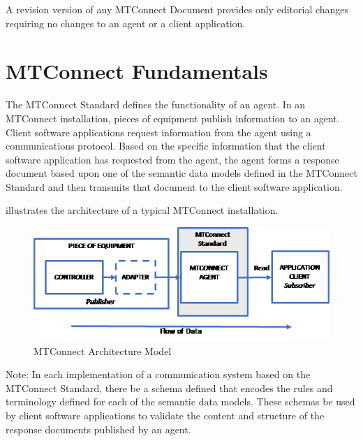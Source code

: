 \documentclass{mtconnect}	%
\begin{document}
A \gls{revision} version of any MTConnect Document provides only editorial changes requiring no changes to an \gls{agent} or a client application.

\section{MTConnect Fundamentals}

The MTConnect Standard defines the functionality of an \gls{agent}.  In an MTConnect installation, pieces of equipment publish information to an \gls{agent}.  Client software applications request information from the \gls{agent} using a communications protocol.  Based on the specific information that the client software application has requested from the \gls{agent}, the \gls{agent} forms a \gls{response document} based upon one of the \glspl{semantic data model} defined in the MTConnect Standard and then transmits that document to the client software application.  

 illustrates the architecture of a typical MTConnect installation. 

\begin{figure}[ht]
  \centering
  \includegraphics[width=1.0\textwidth]{figures/mtconnect-architecture-model.png}
  \caption{MTConnect Architecture Model}
  \label{fig:mtconnect-architecture-model}
\end{figure}

\FloatBarrier

\begin{note}
Note: In each implementation of a communication system based on the MTConnect Standard, there \MUST be a schema defined that encodes the rules and terminology defined for each of the \glspl{semantic data model}.  These schemas \MAY be used by client software applications to validate the content and structure of the \glspl{response document} published by an \gls{agent}.

\end{note}
\end{document}
